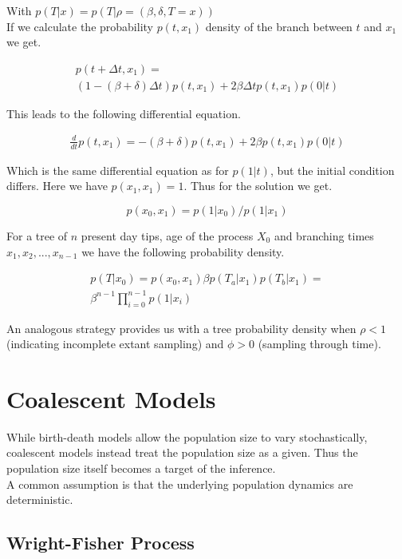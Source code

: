 \documentclass{article}
\begin{document}
\begin{multicols*}{3}
With $p(T|x) = p(T|\rho = (\beta,\delta, T = x))$\\

If we calculate the probability $p(t,x_1)$ density of the branch between $t$ and $x_1$ we get. 

\begin{align*}
p(t+\Delta t, x_1) = \\(1-(\beta+\delta)\Delta t ) p(t,x_1) + 2\beta \Delta t p(t,x_1) p(0|t)    
\end{align*}

This leads to the following differential equation. 

\begin{align*}
    \frac{d}{dt}p(t,x_1) = -(\beta+\delta)p(t,x_1) + 2\beta p(t,x_1)p(0|t)
\end{align*}

Which is the same differential equation as for $p(1|t)$, but the initial condition differs. Here we have $p(x_1,x_1) = 1$. Thus for the solution we get. 

$$p(x_0,x_1) = p(1|x_0)/p(1|x_1)$$

For a tree of $n$ present day tips, age of the process $X_0$ and branching times $x_1, x_2,...,x_{n-1}$ we have the following probability density. 

\begin{align*}
p(T|x_0) = p(x_0,x_1)\beta p (T_a|x_1)p(T_b|x_1) =\\ \beta^{n-1} \prod_{i = 0}^{n-1} p (1|x_i)    
\end{align*}

An analogous strategy provides us with a tree probability density when $\rho < 1$ (indicating incomplete extant sampling) and $\phi > 0$ (sampling through time). 


\section{Coalescent Models}

While birth-death models allow the population size to vary stochastically, coalescent models instead treat the population size as a given. Thus the population size itself becomes a target of the inference.\\
A common assumption is that the underlying population dynamics are deterministic. 

\subsection{Wright-Fisher Process}


\end{multicols*}
\end{document}
